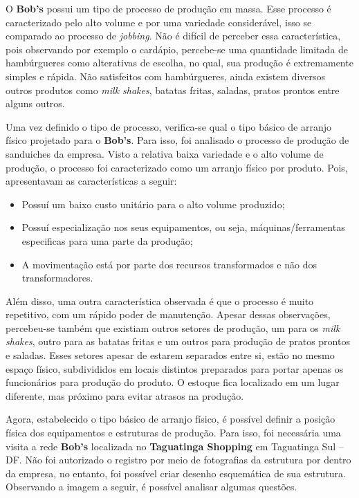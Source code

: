 		O \textbf{Bob’s} possui um tipo de processo de produção em massa. Esse processo é caracterizado pelo alto volume e por uma variedade considerável, isso se comparado ao processo de \emph{jobbing}. Não é difícil de perceber essa característica, pois observando por exemplo o cardápio, percebe-se uma quantidade limitada de hambúrgueres como alterativas de escolha, no qual, sua produção é extremamente simples e rápida. Não satisfeitos com hambúrgueres, ainda existem diversos outros produtos como \emph{milk shakes}, batatas fritas, saladas, pratos prontos entre alguns outros.

		Uma vez definido o tipo de processo, verifica-se qual o tipo básico de arranjo físico projetado para o \textbf{Bob’s}. Para isso, foi analisado o processo de produção de sanduiches da empresa. Visto a relativa baixa variedade e o alto volume de produção, o processo foi caracterizado como um arranjo físico por produto. Pois, apresentavam as características a seguir:

		\begin{itemize}
			\item{Possuí um baixo custo unitário para o alto volume produzido;}
			\item{Possuí especialização nos seus equipamentos, ou seja, máquinas/ferramentas especificas para uma parte da produção;}
			\item{A movimentação está por parte dos recursos transformados e não dos transformadores.}
		\end{itemize}

		Além disso, uma outra característica observada é que o processo é muito repetitivo, com um rápido poder de manutenção. Apesar dessas observações, percebeu-se também que existiam outros setores de produção, um para os \emph{milk shakes}, outro para as batatas fritas e um outros para produção de pratos prontos e saladas. Esses setores apesar de estarem separados entre si, estão no mesmo espaço físico, subdivididos em locais distintos preparados para portar apenas os funcionários para produção do produto. O estoque fica localizado em um lugar diferente, mas próximo para evitar atrasos na produção.

		Agora, estabelecido o tipo básico de arranjo físico, é possível definir a posição física dos equipamentos e estruturas de produção. Para isso, foi necessária uma visita a rede \textbf{Bob’s} localizada no \textbf{Taguatinga Shopping} em Taguatinga Sul – DF. Não foi autorizado o registro por meio de fotografias da estrutura por dentro da empresa, no entanto, foi possível criar desenho esquemática de sua estrutura. Observando a imagem a seguir, é possível analisar algumas questões.

